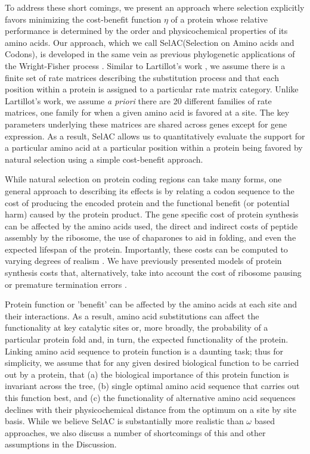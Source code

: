 \documentclass[12pt,letterpaper,fleqn]{article}
\newcommand{\PC}{physicochemical\xspace}
\newcommand{\selac}{SelAC\xspace}
\begin{document}
To address these short comings, we present an approach where selection explicitly favors minimizing the cost-benefit function $\eta$ of a protein whose relative performance is determined by the order and \PC properties of its amino acids.
Our approach, which we call \selac (Selection on Amino acids and Codons), is developed in the same vein as previous phylogenetic applications of the Wright-Fisher process \citep[e.g.~][]{MuseAndGaut1994,HalpernAndBruno1998,YangAndNielsen2008,RodrigueEtAl2005,KoshiAndGoldstein1997,KoshiEtAl1999,DimmicEtAl2000,ThorneEtAl2012,LartillotAndPhilippe2004,RodrigueAndLartillot2014}.
Similar to Lartillot's work \citep{LartillotAndPhilippe2004,RodrigueAndLartillot2014}, we assume there is a finite set of rate matrices describing the substitution process and that each position within a protein is assigned to a particular rate matrix category.
Unlike Lartillot's work, we assume \emph{a priori} there are 20 different families of rate matrices, one family for when a given amino acid is favored at a site.
The key parameters underlying these matrices are shared across genes except for gene expression.
As a result, \selac allows us to quantitatively evaluate the support for a particular amino acid at a particular position within a protein being favored by natural selection using a simple cost-benefit approach.

While natural selection on protein coding regions can take many forms, one general approach to describing its effects is by relating a codon sequence to the cost of producing the encoded protein and the functional benefit (or potential harm) caused by the protein product.
The gene specific cost of protein synthesis can be affected by the amino acids used, the direct and indirect costs of peptide assembly by the ribosome, the use of chaparones to aid in folding, and even the expected lifespan of the protein.
Importantly, these costs can be computed to varying degrees of realism \citep[e.g.][]{Wagner2005,LynchAndMarinov2015}.
We have previously presented models of protein synthesis costs that, alternatively, take into account the cost of ribosome pausing \citep{ShahAndGilchrist2011} or premature termination errors \citep{GilchristAndWagner2006,Gilchrist2007,GilchristEtAl2009}.

Protein function or 'benefit' can be affected by the amino acids at each site and their interactions.
As a result, amino acid substitutions can affect the functionality at key catalytic sites or, more broadly, the probability of a particular protein fold and, in turn, the expected functionality of the protein.
Linking amino acid sequence to protein function is a daunting task; thus for simplicity, we assume that for any given desired biological function to be carried out by a protein, that (a) the biological importance of this protein function is invariant across the tree, (b) single optimal amino acid sequence that carries out this function best, and (c) the functionality of alternative amino acid sequences declines with their \PC distance from the optimum on a site by site basis.
While we believe \selac is substantially more realistic than $\omega$ based approaches, we also discuss a number of shortcomings of this and other assumptions in the Discussion.
 
\end{document}

